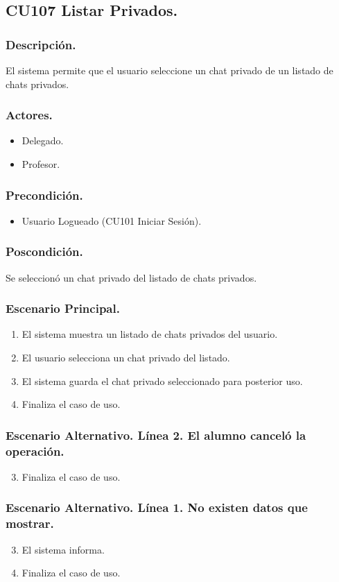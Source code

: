 \subsection{CU107 Listar Privados.}
\subsubsection{Descripci\'{o}n.}
El sistema permite que el usuario seleccione un chat privado de un listado de chats privados.
\subsubsection{Actores.}
\begin{itemize}
\item Delegado.
\item Profesor.
\end{itemize}
\subsubsection{Precondici\'{o}n.}
\begin{itemize}
\item Usuario Logueado (CU101 Iniciar Sesi\'{o}n).
\end{itemize}
\subsubsection{Poscondici\'{o}n.}
Se seleccion\'{o} un chat privado del listado de chats privados.
\subsubsection{Escenario Principal.}
\begin{enumerate}
\item El sistema muestra un listado de chats privados del usuario.
\item El usuario selecciona un chat privado del listado.
\item El sistema guarda el chat privado seleccionado para posterior uso.
\item Finaliza el caso de uso.
\end{enumerate}

\subsubsection{Escenario Alternativo. L\'{i}nea 2. El alumno cancel\'{o} la operaci\'{o}n.}
\begin{enumerate}
\setcounter{enumi}{2}
\item Finaliza el caso de uso.
\end{enumerate}

\subsubsection{Escenario Alternativo. L\'{i}nea 1. No existen datos que mostrar.}
\begin{enumerate}
\setcounter{enumi}{2}
\item El sistema informa.
\item Finaliza el caso de uso.
\end{enumerate}
